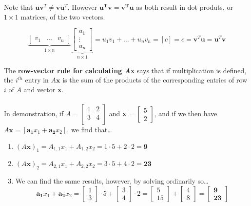 \documentclass[12pt]{article}
\newcommand{\bt}[1]{\textbf{{#1}}}
\newcommand{\bm}[1]{\mathbf{{#1}}}
\newcommand{\mb}{\begin{bmatrix}}
\newcommand{\me}{\end{bmatrix}}
\begin{document}
Note that $\bm{uv}^T \neq \bm{vu}^T$. However $\bm{u^Tv = v^Tu}$ as both result in dot produts, or $1 \times 1$ matrices, of the two vectors.

$$\underbrace{\mb v_1 & \dots & v_n \me}_{1 \times n} \underbrace{\mb u_1 \\ \vdots \\ u_n \me}_{n \times 1} = u_1 v_1 + \dots + u_n v_n = [c] = c = \bm{v}^T\bm{u} = \bm{u}^T\bm{v}$$

The \bt{row-vector rule for calculating \emph{A}x} says that if multiplication is defined, the $i^{th}$ entry in $A\bm{x}$ is the sum of the products of the
corresponding entries of row $i$ of $A$ and vector \bt{x}. \\ \\

In demonstration, if $A=\begin{bmatrix} 1 & 2 \\ 3 & 4 \\ \end{bmatrix}$ and \bt{x} = $\begin{bmatrix} 5 \\ 2 \end{bmatrix}$, and if we then have $A\bm{x} = [\bm{a_1}x_1 + \bm{a_2}x_2]$, we find that\dots

\begin{enumerate}
    \item $(A\bm{x})_1 = A_{1,1}x_1 + A_{1,2}x_2 = 1\cdot 5 + 2\cdot 2 = \bm{9}$
    \item $(A\bm{x})_2 = A_{2,1}x_1 + A_{2,2}x_2 = 3 \cdot 5 + 4\cdot 2 = \bm{23}$
    \item We can find the same results, however, by solving ordinarily so\dots
    $$\bm{a_1}x_1 + \bm{a_2}x_2 =
    \begin{bmatrix} 1 \\ 3 \end{bmatrix} \cdot 5 + \begin{bmatrix} 3 \\ 4 \end{bmatrix} \cdot 2 =
    \begin{bmatrix} 5 \\ 15 \end{bmatrix} + \begin{bmatrix} 4 \\ 8 \end{bmatrix} = \begin{bmatrix} \bm{9} \\ \bm{23} \end{bmatrix}
    $$
\end{enumerate}
\end{document}
